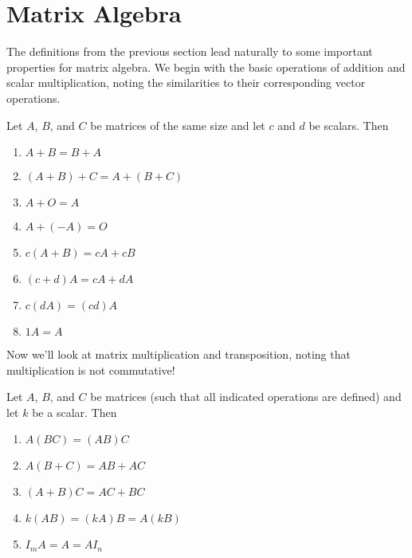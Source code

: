 \documentclass[../m073main.tex]{subfiles}
\begin{document}

\section{Matrix Algebra}
The definitions from the previous section lead naturally to some important properties for matrix algebra.
We begin with the basic operations of addition and scalar multiplication, noting the similarities to their corresponding vector operations.

\begin{theorem}
	Let $A$, $B$, and $C$ be matrices of the same size and let $c$ and $d$ be scalars.
	Then
	\begin{enumerate}[label=(\alph*)]
		\item $A + B = B + A$
		\item $(A + B) + C = A + (B + C)$
		\item $A + O = A$
		\item $A + (-A) = O$
		\item $c(A + B) = cA + cB$
		\item $(c+d)A = cA + dA$
		\item $c(dA) = (cd)A$
		\item $1A = A$
	\end{enumerate}
\end{theorem}

Now we'll look at matrix multiplication and transposition, noting that multiplication is not commutative!

\begin{theorem}
	Let $A$, $B$, and $C$ be matrices (such that all indicated operations are defined) and let $k$ be a scalar.
	Then
	\begin{enumerate}[label=(\alph*)]
		\item $A(BC) = (AB)C$
		\item $A(B+C) = AB+AC$
		\item $(A+B)C = AC+BC$
		\item $k(AB) = (kA)B = A(kB)$
		\item $I_mA = A = AI_n$
	\end{enumerate}
\end{theorem}
\end{document}
